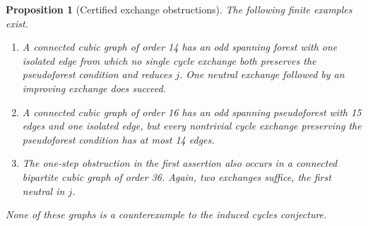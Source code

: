 \documentclass[11pt]{article}
\newtheorem{proposition}[theorem]{Proposition}
\begin{document}
\begin{proposition}[Certified exchange obstructions]\label{prop:repair-traps}
The following finite examples exist.
\begin{enumerate}
\item A connected cubic graph of order 14 has an odd spanning
forest with one isolated edge from which no single cycle exchange
both preserves the pseudoforest condition and reduces $j$.
One neutral exchange followed by an improving exchange does succeed.
\item A connected cubic graph of order 16 has an odd spanning
pseudoforest with 15 edges and one isolated edge, but every
nontrivial cycle exchange preserving the pseudoforest condition
has at most 14 edges.
\item The one-step obstruction in the first assertion also occurs
in a connected bipartite cubic graph of order 36. Again, two
exchanges suffice, the first neutral in $j$.
\end{enumerate}
None of these graphs is a counterexample to the induced cycles
conjecture.
\end{proposition}
\end{document}
